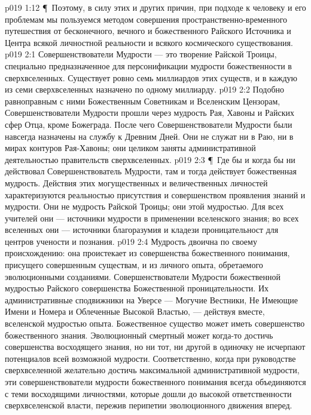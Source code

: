 \vs p019 1:12 \P\ Поэтому, в силу этих и других причин, при подходе к человеку и его проблемам мы пользуемся методом совершения пространственно\hyp{}временного путешествия от бесконечного, вечного и божественного Райского Источника и Центра всякой личностной реальности и всякого космического существования.
\vs p019 2:1 Совершенствователи Мудрости --- это творение Райской Троицы, специально предназначенное для персонификации мудрости божественности в сверхвселенных. Существует ровно семь миллиардов этих существ, и в каждую из семи сверхвселенных назначено по одному миллиарду.
\vs p019 2:2 Подобно равноправным с ними Божественным Советникам и Вселенским Цензорам, Совершенствователи Мудрости прошли через мудрость Рая, Хавоны и Райских сфер Отца, кроме Божеграда. После чего Совершенствователи Мудрости были навсегда назначены на службу к Древним Дней. Они не служат ни в Раю, ни в мирах контуров Рая\hyp{}Хавоны; они целиком заняты административной деятельностью правительств сверхвселенных.
\vs p019 2:3 \P\ Где бы и когда бы ни действовал Совершенствователь Мудрости, там и тогда действует божественная мудрость. Действия этих могущественных и величественных личностей характеризуются реальностью присутствия и совершенством проявления знаний и мудрости. Они не  мудрость Райской Троицы; они  этой мудростью. Для всех учителей они --- источники мудрости в применении вселенского знания; во всех вселенных они --- источники благоразумия и кладези проницательност для центров учености и познания.
\vs p019 2:4 Мудрость двоична по своему происхождению: она проистекает из совершенства божественного понимания, присущего совершенным существам, и из личного опыта, обретаемого эволюционными созданиями. Совершенствователи Мудрости  божественной мудростью Райского совершенства Божественной проницательности. Их административные сподвижники на Уверсе --- Могучие Вестники, Не Имеющие Имени и Номера и Облеченные Высокой Властью, --- действуя вместе,  вселенской мудростью опыта. Божественное существо может иметь совершенство божественного знания. Эволюционный смертный может когда\hyp{}то достичь совершенства восходящего знания, но ни тот, ни другой в одиночку не исчерпают потенциалов всей возможной мудрости. Соответственно, когда при руководстве сверхвселенной желательно достичь максимальной административной мудрости, эти совершенствователи мудрости божественного понимания всегда объединяются с теми восходящими личностями, которые дошли до высокой ответственности сверхвселенской власти, пережив перипетии эволюционного движения вперед.
